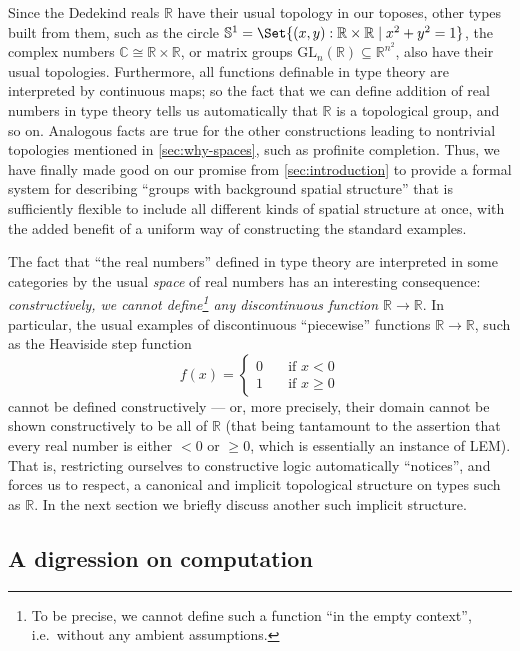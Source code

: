 \documentclass[10pt]{article}
\let\setof\Set
\def\R{\mathbb{R}}
\def\topcirc{\mathbb{S}^1}
\numberwithin{equation}{section}
\begin{document}
Since the Dedekind reals $\R$ have their usual topology in our toposes, other types built from them, such as the circle $\topcirc = \setof{ (x,y):\R\times\R \mid x^2+y^2=1 }$, the complex numbers $\mathbb{C} \cong \R\times \R$, or matrix groups $\mathrm{GL}_n(\R) \subseteq \R^{n^2}$,
also have their usual topologies.
Furthermore, all functions definable in type theory are interpreted by continuous maps; so the fact that we can define addition of real numbers in type theory tells us automatically that $\R$ is a topological group, and so on.
Analogous facts are true for the other constructions leading to nontrivial topologies mentioned in \cref{sec:why-spaces}, such as profinite completion.
Thus, we have finally made good on our promise from \cref{sec:introduction} to provide a formal system for describing ``groups with background spatial structure'' that is sufficiently flexible to include all different kinds of spatial structure at once, with the added benefit of a uniform way of constructing the standard examples.

The fact that ``the real numbers'' defined in type theory are interpreted in some categories by the usual \emph{space} of real numbers has an interesting consequence: \textit{constructively, we cannot define\footnote{To be precise, we cannot define such a function ``in the empty context'', i.e.\ without any ambient assumptions.} any discontinuous function $\R\to\R$}.
In particular, the usual examples of discontinuous ``piecewise'' functions $\R\to\R$, such as the Heaviside step function
\[ f(x) =
\begin{cases}
  0 &\quad \text{if } x<0\\
  1 &\quad \text{if } x\ge 0
\end{cases}\]
cannot be defined constructively --- or, more precisely, their domain cannot be shown constructively to be all of $\R$ (that being tantamount to the assertion that every real number is either $<0$ or $\ge 0$, which is essentially an instance of LEM).
That is, restricting ourselves to constructive logic automatically ``notices'', and forces us to respect, a canonical and implicit topological structure on types such as $\R$.
In the next section we briefly discuss another such implicit structure.


\subsection{A digression on computation}
\label{sec:compute}
\end{document}

